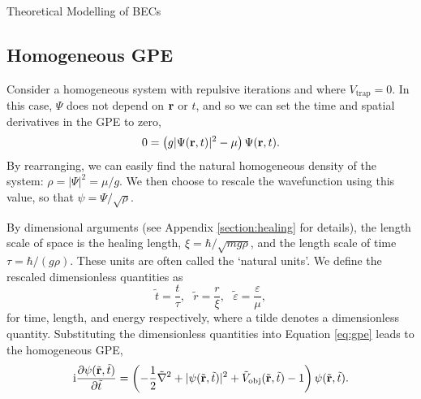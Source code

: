 \begin{chapter}{\label{cha:theoretical_model}Theoretical Modelling of BECs}
	\subsection{\label{section:gpedimlesshomg} Homogeneous GPE}
		Consider a homogeneous system with repulsive iterations and where $V_{\mathrm{trap}} = 0$. In this case, $\Psi$ does not depend on ${\bf r}$ or $t$, and so we can set the time and spatial derivatives in the GPE to zero,
		\begin{equation}
		0 = \left(g|\Psi({\bf r},t)|^2 - \mu \right) \Psi({\bf r},t).
		\end{equation}
		By rearranging, we can easily find the natural homogeneous density of the system: $\rho = |\Psi|^2 = \mu/g$. We then choose to rescale the wavefunction using this value, so that $\psi = \Psi/\sqrt{\rho}$.

		By dimensional arguments (see Appendix \ref{section:healing} for details), the length scale of space is the healing length, $\xi = \hbar/\sqrt{mg\rho}$, and the length scale of time $\tau = \hbar/(g\rho)$. These units are often called the `natural units'. We define the rescaled dimensionless quantities as
		\begin{equation}
			\tilde{t} = \frac{t}{\tau}, ~~~ \tilde{r} = \frac{r}{\xi}, ~~~ \tilde{\varepsilon} = \frac{\varepsilon}{\mu},
		\end{equation}
		for time, length, and energy respectively, where a tilde denotes a dimensionless quantity. Substituting the dimensionless quantities into Equation \ref{eq:gpe} leads to the homogeneous GPE,
		\begin{equation}\label{eq:dimgpehomg}
		\mathrm{i}\frac{\partial\psi({\tilde{\bf r}},\tilde{t})}{\partial {\tilde{t}}} = \left( -\frac{1}{2}\tilde{\nabla}^2 + |\psi({\tilde{\bf r}},\tilde{t})|^2 + \tilde{V}_{\mathrm{obj}}({\tilde{\bf r}},\tilde{t}) - 1 \right) \psi({\tilde{\bf r}},\tilde{t}).
		\end{equation}


\end{chapter}

